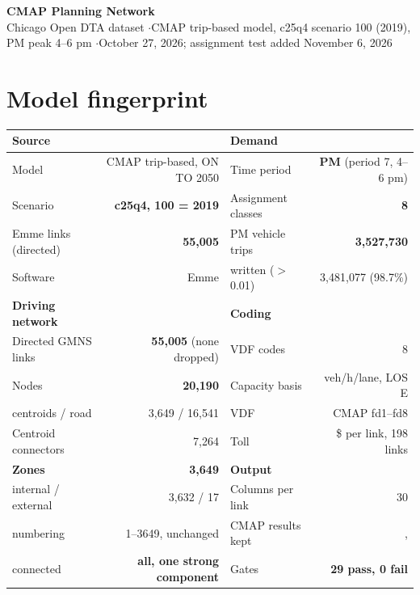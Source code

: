 \documentclass[10pt,a4paper]{extarticle}
\newcommand{\C}[1]{\texttt{\small\detokenize{#1}}}
\newcommand{\ok}[1]{\textcolor{good}{\textbf{#1}}}
\begin{document}
\begin{center}
{\LARGE\bfseries CMAP Planning Network}\\[6pt]
{\footnotesize Chicago Open DTA dataset \quad$\cdot$\quad CMAP trip-based model, c25q4 scenario 100 (2019), PM peak 4--6 pm
\quad$\cdot$\quad October 27, 2026; assignment test added November 6, 2026}
\end{center}
\vspace{4pt}

\section{Model fingerprint}

\begin{center}
\begin{tabular}{@{}lr@{\hskip 26pt}lr@{}}
\toprule
\textbf{Source} & & \textbf{Demand} & \\
\midrule
Model                  & CMAP trip-based, ON TO 2050 & Time period             & \textbf{PM} (period 7, 4--6 pm) \\
Scenario               & \textbf{c25q4, 100 = 2019}  & Assignment classes      & \textbf{8} \\
Emme links (directed)  & \textbf{55,005}             & PM vehicle trips        & \textbf{3,527,730} \\
Software               & Emme                        & \quad written ($>$0.01) & 3,481,077 (98.7\%) \\
\addlinespace
\textbf{Driving network} &                           & \textbf{Coding}         & \\
\midrule
Directed GMNS links    & \textbf{55,005} (none dropped) & VDF codes            & 8 \\
Nodes                  & \textbf{20,190}             & Capacity basis          & veh/h/lane, LOS E \\
\quad centroids / road  & 3,649 / 16,541             & VDF                     & CMAP fd1--fd8 \\
Centroid connectors    & 7,264                       & Toll                    & \$ per link, 198 links \\
\addlinespace
\textbf{Zones}         & \textbf{3,649}              & \textbf{Output}         & \\
\midrule
\quad internal / external & 3,632 / 17               & Columns per link        & 30 \\
\quad numbering         & 1--3649, unchanged         & CMAP results kept       & \C{ref_volume}, \C{ref_time} \\
\quad connected         & \ok{all, one strong component} & Gates             & \ok{29 pass, 0 fail} \\
\bottomrule
\end{tabular}
\end{center}
\end{document}
